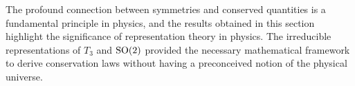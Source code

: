     The profound connection between symmetries and conserved quantities is a fundamental principle in physics, and the results obtained in this section highlight the significance of representation theory in physics. The irreducible representations of $T_3$ and $\textrm{SO}{(2)}$ provided the necessary mathematical framework to derive conservation laws without having a preconceived notion of the physical universe.

    
    



